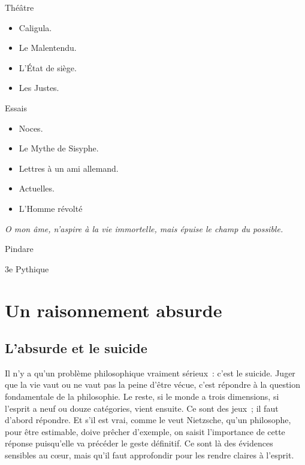 \documentclass{book}
\begin{document}
Théâtre

    \begin{itemize}
        \item Caligula.

        \item Le Malentendu.

        \item L'État de siège.

        \item Les Justes.
    \end{itemize}

Essais

    \begin{itemize}
        \item Noces.

        \item Le Mythe de Sisyphe.

        \item Lettres à un ami allemand.

        \item Actuelles.

        \item L'Homme révolté
    \end{itemize}

\tableofcontents

\newpage

\emph{O mon âme, n’aspire à la vie immortelle, mais épuise le champ du possible.}

Pindare

3e Pythique

\mainmatter{}

\chapter{Un raisonnement absurde}

\section{L'absurde et le suicide}

Il n'y a qu'un problème philosophique vraiment sérieux : c'est le suicide. Juger que la vie vaut ou ne vaut pas la peine d'être vécue, c'est répondre à la question fondamentale de la philosophie. Le reste, si le monde a trois dimensions, si l'esprit a neuf ou douze catégories, vient ensuite. Ce sont des jeux ; il faut d'abord répondre. Et s'il est vrai, comme le veut Nietzsche, qu'un philosophe, pour être estimable, doive prêcher d'exemple, on saisit l'importance de cette réponse puisqu'elle va précéder le geste définitif. Ce sont là des évidences sensibles au cœur, mais qu'il faut approfondir pour les rendre claires à l'esprit.
\end{document}
